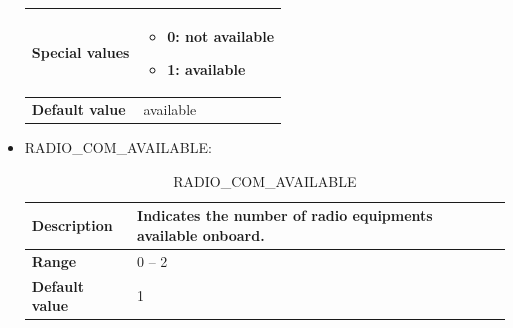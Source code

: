 \begin{itemize}
\begin{longtable}{|l|l|}
				\hline

					\begin{minipage}[t]{0.22\linewidth} \textbf{Special values}	\end{minipage}
				&	\begin{minipage}[t]{0.78\linewidth} \begin{itemize} \item 0: not available \item 1: available \end{itemize} \end{minipage} \\

				\hline

					\begin{minipage}[t]{0.22\linewidth} \textbf{Default value}	\end{minipage}
				&	\begin{minipage}[t]{0.78\linewidth} available \end{minipage} \\

				\hline

			\end{longtable}

		\item RADIO\_COM\_AVAILABLE:

			\begin{longtable}{|l|l|}
				\caption{RADIO\_COM\_AVAILABLE}\\
				\hline

					\begin{minipage}[t]{0.22\linewidth} \textbf{Description}	\end{minipage}
				&	\begin{minipage}[t]{0.78\linewidth} Indicates the number of radio equipments available onboard. \end{minipage} \\

				\hline

					\begin{minipage}[t]{0.22\linewidth} \textbf{Range}	\end{minipage}
				&	\begin{minipage}[t]{0.78\linewidth} 0 – 2 \end{minipage} \\

				\hline

					\begin{minipage}[t]{0.22\linewidth} \textbf{Default value}	\end{minipage}
				&	\begin{minipage}[t]{0.78\linewidth} 1 \end{minipage} \\


\end{longtable}
\end{itemize}
